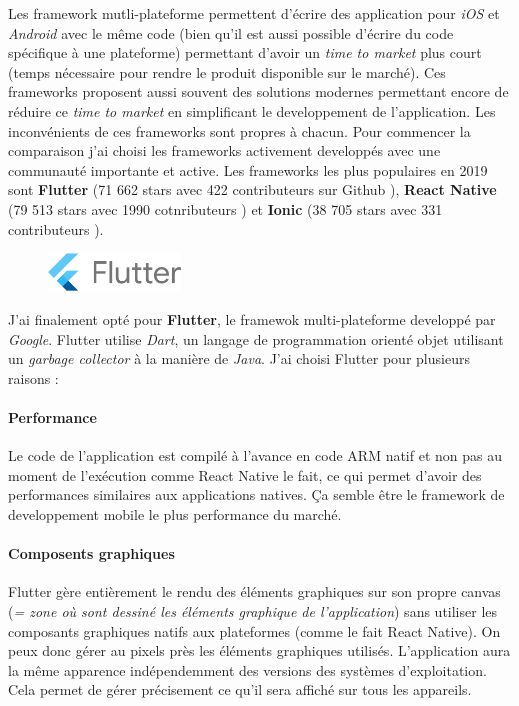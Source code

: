 Les framework mutli-plateforme permettent d'écrire des application pour \textit{iOS} et \textit{Android} avec le même code (bien qu'il est aussi possible d'écrire du code spécifique à une plateforme) permettant d'avoir un \textit{time to market} plus court (temps nécessaire pour rendre le produit disponible sur le marché). Ces frameworks proposent aussi souvent des solutions modernes permettant encore de réduire ce \textit{time to market} en simplificant le developpement de l'application. Les inconvénients de ces frameworks sont propres à chacun. Pour commencer la comparaison j'ai choisi les frameworks activement developpés avec une communauté importante et active. Les frameworks les plus populaires en 2019 sont \textbf{Flutter} (71 662 stars avec 422 contributeurs sur Github \cite{flutter}), \textbf{React Native} (79 513 stars avec 1990 cotnributeurs \cite{react}) et \textbf{Ionic} (38 705 stars avec 331 contributeurs \cite{ionic}).

\begin{figure}
  \includegraphics[width=100pt]{content/imgs/flutter.png}
\end{figure}

J'ai finalement opté pour \textbf{Flutter}, le framewok multi-plateforme developpé par \textit{Google}. Flutter utilise \textit{Dart}, un langage de programmation orienté objet utilisant un \textit{garbage collector} à la manière de \textit{Java}. J'ai choisi Flutter pour plusieurs raisons :

\paragraph{Performance}
Le code de l'application est compilé à l'avance en code ARM natif et non pas au moment de l'exécution comme React Native le fait, ce qui permet d'avoir des performances similaires aux applications natives. Ça semble être le framework de developpement mobile le plus performance du marché.

\paragraph{Composents graphiques}
Flutter gère entièrement le rendu des éléments graphiques sur son propre canvas (\textit{= zone où sont dessiné les éléments graphique de l'application}) sans utiliser les composants graphiques natifs aux plateformes (comme le fait React Native). On peux donc gérer au pixels près les éléments graphiques utilisés. L'application aura la même apparence indépendemment des versions des systèmes d'exploitation. Cela permet de gérer précisement ce qu'il sera affiché sur tous les appareils.


